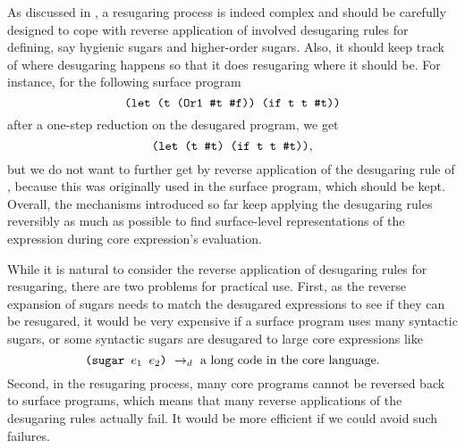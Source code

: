 As discussed in \cite{resugaring,hygienic}, a resugaring process is indeed complex and should be carefully designed to cope with reverse application of involved desugaring rules for defining, say hygienic sugars and higher-order sugars. Also, it should keep track of where desugaring happens so that it does resugaring where it should be. For instance, for the following surface program
\[
\texttt{(let (t (Or1 \#t \#f)) (if t t \#t))}
\]
after a one-step reduction on the desugared program, we get
\[
\texttt{(let (t \#t) (if t t \#t))},
\]
but we do not want to further get  by reverse application of the desugaring rule of , because this  was originally used in the surface program, which should be kept.
Overall, the mechanisms introduced so far keep applying the desugaring rules reversibly as much as possible to find surface-level representations of the expression during core expression's evaluation.

While it is natural to consider the reverse application of desugaring rules for resugaring, there are two problems for practical use. First, as the reverse expansion of sugars needs to match the desugared expressions to see if they can be resugared, it would be very expensive if a surface program uses many syntactic sugars, or some syntactic sugars are desugared to large core expressions like
\[
\texttt{(sugar $e_1$ $e_2$)} ~\rightarrow_d~ \mbox{a long code in the core language}.
\]
Second, in the resugaring process, many core programs cannot be reversed back to surface programs, which means that many reverse applications of the desugaring rules actually fail. It would be more efficient if we could avoid such failures.




